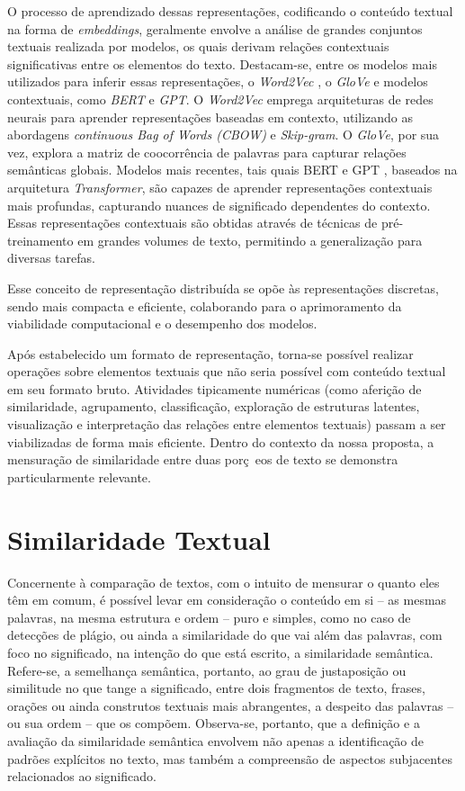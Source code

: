 O processo de aprendizado dessas representações, codificando o conteúdo textual na forma de \textit{embeddings}, geralmente envolve a análise de grandes conjuntos textuais realizada por modelos, os quais derivam relações contextuais significativas entre os elementos do texto. Destacam-se, entre os modelos mais utilizados para inferir essas representações, o \textit{Word2Vec} \cite{Representacao-Distribuida:3}, o \textit{GloVe} \cite{Representacao-Distribuida:5} e modelos contextuais, como \textit{\ac{BERT}} e \textit{\ac{GPT}}. O \textit{Word2Vec} emprega arquiteturas de redes neurais para aprender representações baseadas em contexto, utilizando as abordagens \textit{continuous Bag of Words (CBOW)} e \textit{Skip-gram}. O \textit{GloVe}, por sua vez, explora a matriz de coocorrência de palavras para capturar relações semânticas globais. Modelos mais recentes, tais quais \ac{BERT} \cite{Representacao-Distribuida:6} e \ac{GPT} \cite{Representacao-Distribuida:7}, baseados na arquitetura \textit{Transformer}, são capazes de aprender representações contextuais mais profundas, capturando nuances de significado dependentes do contexto. Essas representações contextuais são obtidas através de técnicas de pré-treinamento em grandes volumes de texto, permitindo a generalização para diversas tarefas.

Esse conceito de representação distribuída se opõe às representações discretas, sendo mais compacta e eficiente, colaborando para o aprimoramento da viabilidade computacional e o desempenho dos modelos.

Após estabelecido um formato de representação, torna-se possível realizar operações sobre elementos textuais que não seria possível com conteúdo textual em seu formato bruto. Atividades tipicamente numéricas (como aferição de similaridade, agrupamento, classificação, exploração de estruturas latentes, visualização e interpretação das relações entre elementos textuais) passam a ser viabilizadas de forma mais eficiente. Dentro do contexto da nossa proposta, a mensuração de similaridade entre duas porç~eos de texto se demonstra particularmente relevante.


\section{Similaridade Textual}
\label{sec:Teorico.3}

Concernente à comparação de textos, com o intuito de mensurar o quanto eles têm em comum, é possível levar em consideração o conteúdo em si -- as mesmas palavras, na mesma estrutura e ordem -- puro e simples, como no caso de detecções de plágio, ou ainda a similaridade do que vai além das palavras, com foco no significado, na intenção do que está escrito, a similaridade semântica. Refere-se, a semelhança semântica, portanto, ao grau de justaposição ou similitude no que tange a significado, entre dois fragmentos de texto, frases, orações ou ainda construtos textuais mais abrangentes, a despeito das palavras -- ou sua ordem -- que os compõem. Observa-se, portanto, que a definição e a avaliação da similaridade semântica envolvem não apenas a identificação de padrões explícitos no texto, mas também a compreensão de aspectos subjacentes relacionados ao significado.

